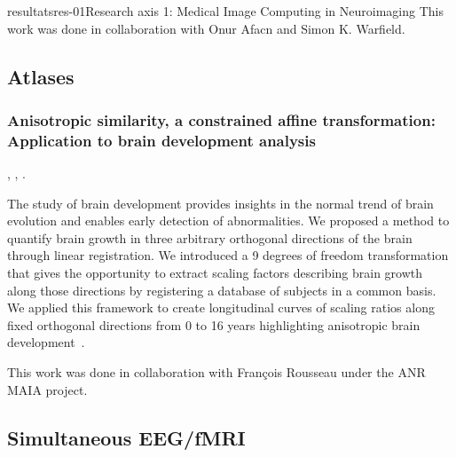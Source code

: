 \documentclass{ra2018}
\begin{document}
\begin{module}{resultats}{res-01}{Research axis 1: Medical Image Computing in Neuroimaging}
This work was done in collaboration with Onur Afacn and Simon K. Warfield.

\subsection{Atlases}
\subsubsection{Anisotropic similarity, a constrained affine transformation: Application to brain development analysis}
\begin{participants}
      ,
      ,
      .
\end{participants}
The study of brain development provides insights in the normal trend of brain evolution and enables early detection of abnormalities. We proposed a method to quantify brain growth in three arbitrary orthogonal directions of the brain through linear registration. We introduced a 9 degrees of freedom transformation that gives the opportunity to extract scaling factors describing brain growth along those directions by registering a database of subjects in a common basis. We applied this framework to create longitudinal curves of scaling ratios along fixed orthogonal directions from 0 to 16 years highlighting anisotropic brain development~\cite{legouhy:inserm-01871274}.

This work was done in collaboration with François Rousseau under the ANR MAIA project.

\subsection{Simultaneous EEG/fMRI}


\end{module}
\end{document}
